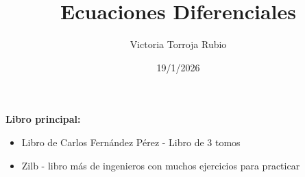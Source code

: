 \documentclass{report}
\begin{document}
\title{Ecuaciones Diferenciales}
\author{Victoria Torroja Rubio}
\date{19/1/2026}

\maketitle

\tableofcontents

\pagebreak

\textbf{Libro principal:} 
\begin{itemize}
\item Libro de Carlos Fernández Pérez - Libro de 3 tomos
\item Zilb - libro más de ingenieros con muchos ejercicios para practicar
\end{itemize}





\end{document}
